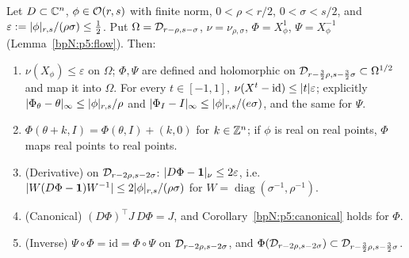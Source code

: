 \begin{proposition}\label{bpN:p5:canonical-map}
Let $D\subset\mathbb{C}^n$, $\phi\in\mathcal O(r,s)$ with finite norm, $0<\rho<r/2$, $0<\sigma<s/2$, and $\varepsilon:=\lvert \phi\rvert_{r,s}/(\rho\sigma)\le\frac12$. Put $\Omega=\mathcal D_{r-\rho,s-\sigma}$, $\nu=\nu_{\rho,\sigma}$, $\Phi=X^1_\phi$, $\Psi=X^{-1}_\phi$ (Lemma~\ref{bpN:p5:flow}). Then:
\begin{enumerate}[label=(\alph*)]
\item $\nu(X_\phi)\le\varepsilon$ on $\Omega$; $\Phi,\Psi$ are defined and holomorphic on $\mathcal D_{r-\frac32\rho,s-\frac32\sigma}\subset\Omega^{1/2}$ and map it into $\Omega$. For every $t\in[-1,1]$, $\nu(X^t-\mathrm{id})\le\lvert t\rvert\varepsilon$; explicitly $\lvert \Phi_\theta-\theta\rvert_\infty\le\lvert \phi\rvert_{r,s}/\rho$ and $\lvert \Phi_I-I\rvert_\infty\le\lvert \phi\rvert_{r,s}/(e\sigma)$, and the same for $\Psi$.
\item $\Phi(\theta+k,I)=\Phi(\theta,I)+(k,0)$ for $k\in\mathbb{Z}^n$; if $\phi$ is real on real points, $\Phi$ maps real points to real points.
\item (Derivative) on $\mathcal D_{r-2\rho,s-2\sigma}$: $\lvert D\Phi-\mathbf 1\rvert_\nu\le2\varepsilon$, i.e.\ $\lvert W(D\Phi-\mathbf 1)W^{-1}\rvert\le2\lvert \phi\rvert_{r,s}/(\rho\sigma)$ for $W=\operatorname{diag}(\sigma^{-1},\rho^{-1})$.
\item (Canonical) $(D\Phi)^\top J\,D\Phi=J$, and Corollary~\ref{bpN:p5:canonical} holds for $\Phi$.
\item (Inverse) $\Psi\circ\Phi=\mathrm{id}=\Phi\circ\Psi$ on $\mathcal D_{r-2\rho,s-2\sigma}$, and $\Phi(\mathcal D_{r-2\rho,s-2\sigma})\subset\mathcal D_{r-\frac32\rho,s-\frac32\sigma}$.
\end{enumerate}
\end{proposition}
